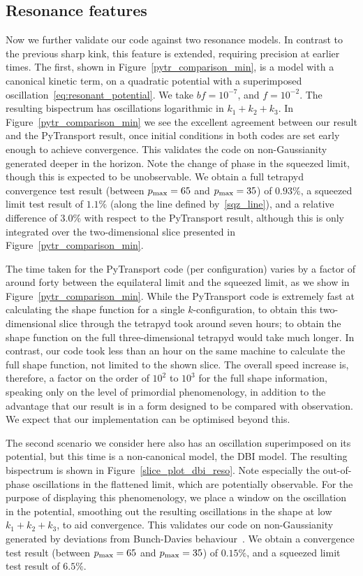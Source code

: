 \subsection{Resonance features}
Now we further validate our code against two
resonance models. In contrast to the previous sharp kink,
this feature is extended, requiring precision at earlier times.
The first, shown in Figure~\ref{pytr_comparison_min},
is a model with a canonical kinetic term, on a
quadratic potential with a superimposed
oscillation~\eqref{eq:resonant_potential}.
We take $bf=10^{-7}$, and $f=10^{-2}$.
The resulting bispectrum has oscillations logarithmic in $k_1+k_2+k_3$.
In Figure~\ref{pytr_comparison_min} we see the excellent agreement
between our result and the PyTransport result, once initial conditions
in both codes are set early enough to achieve convergence.
This validates the code on non-Gaussianity generated deeper
in the horizon. Note the change of phase in the squeezed limit,
though this is expected to be unobservable.
We obtain a full tetrapyd convergence test result
(between $p_\text{max}=65$ and $p_\text{max}=35$)
of $0.93\%$, a squeezed limit test result of $1.1\%$
(along the line defined by~\eqref{sqz_line}),
and a relative difference of $3.0\%$ with respect to the
PyTransport result,
although this is only integrated over the two-dimensional slice presented in
Figure~\ref{pytr_comparison_min}.


The time taken for the PyTransport code (per configuration) varies by a factor of around forty
between the equilateral limit and the squeezed limit,
as we show in Figure~\ref{pytr_comparison_min}.
While the PyTransport code is extremely fast at calculating the shape function
for a single $k$-configuration,
to obtain this two-dimensional slice through the tetrapyd took around seven hours;
to obtain the shape function on the full three-dimensional tetrapyd would take much longer.
In contrast, our code took less than an hour on the same machine to calculate
the full shape function, not limited to the shown slice.
The overall speed increase is, therefore, a factor on the order of $10^2$ to $10^3$
for the full shape information, speaking only on the level of primordial
phenomenology, in addition to the advantage that our result is in a form
designed to be compared with observation.
We expect that our implementation can be optimised beyond this.


The second scenario we consider here also has an
oscillation superimposed on its potential, but this time
is a non-canonical model, the DBI model.
The resulting bispectrum is shown in Figure~\ref{slice_plot_dbi_reso}.
Note especially the out-of-phase oscillations in the flattened limit,
which are potentially observable.
For the purpose of displaying this phenomenology, we place a window
on the oscillation in the potential, smoothing out the resulting oscillations
in the shape at low $k_1+k_2+k_3$, to aid convergence.
This validates our code on non-Gaussianity generated by deviations from Bunch-Davies
behaviour~\cite{chen_folded_resonant,features_bartolo}.
We obtain a convergence test result (between $p_\text{max}=65$ and $p_\text{max}=35$)
of $0.15\%$, and a squeezed limit test result of $6.5\%$.


